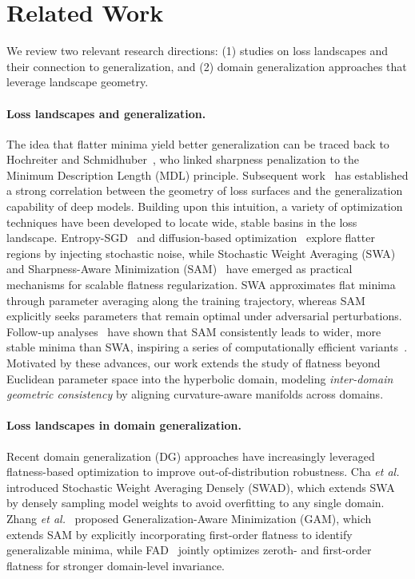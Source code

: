 \documentclass[10pt]{article} %
\begin{document}
\section{Related Work}

We review two relevant research directions: (1) studies on loss landscapes and their connection to generalization, and (2) domain generalization approaches that leverage landscape geometry.

\paragraph{Loss landscapes and generalization.}
The idea that flatter minima yield better generalization can be traced back to Hochreiter and Schmidhuber~\cite{hochreiter1997flat}, who linked sharpness penalization to the Minimum Description Length (MDL) principle. 
Subsequent work~\cite{keskar2016large, dziugaite2017computing, izmailov2018averaging} has established a strong correlation between the geometry of loss surfaces and the generalization capability of deep models.
Building upon this intuition, a variety of optimization techniques have been developed to locate wide, stable basins in the loss landscape.
Entropy-SGD~\cite{chaudhari2019entropy} and diffusion-based optimization~\cite{mobahi2016training} explore flatter regions by injecting stochastic noise, while Stochastic Weight Averaging (SWA)~\cite{izmailov2018averaging} and Sharpness-Aware Minimization (SAM)~\cite{foret2020sharpness} have emerged as practical mechanisms for scalable flatness regularization.
SWA approximates flat minima through parameter averaging along the training trajectory, whereas SAM explicitly seeks parameters that remain optimal under adversarial perturbations.
Follow-up analyses~\cite{kaddour2022flat} have shown that SAM consistently leads to wider, more stable minima than SWA, inspiring a series of computationally efficient variants~\cite{du2022sharpness, ji2024single, jiang2023adaptive}.
Motivated by these advances, our work extends the study of flatness beyond Euclidean parameter space into the hyperbolic domain, modeling \textit{inter-domain geometric consistency} by aligning curvature-aware manifolds across domains.

\paragraph{Loss landscapes in domain generalization.}
Recent domain generalization (DG) approaches have increasingly leveraged flatness-based optimization to improve out-of-distribution robustness.
Cha \textit{et al.}~\cite{cha2021swad} introduced Stochastic Weight Averaging Densely (SWAD), which extends SWA by densely sampling model weights to avoid overfitting to any single domain.
Zhang \textit{et al.}~\cite{zhang2023gradient} proposed Generalization-Aware Minimization (GAM), which extends SAM by explicitly incorporating first-order flatness to identify generalizable minima, while FAD~\cite{zhang2023flatness} jointly optimizes zeroth- and first-order flatness for stronger domain-level invariance.
\end{document}
